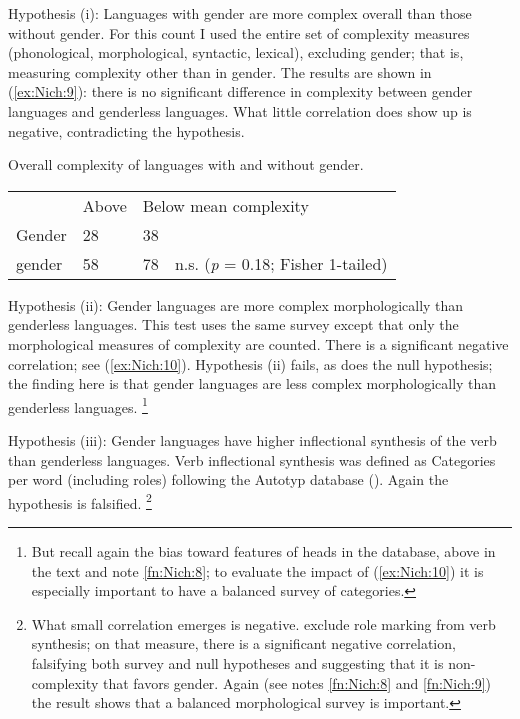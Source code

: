 \documentclass[output=collectionpaper]{langsci/langscibook}
\begin{document}
Hypothesis (i): Languages with gender are more complex overall than those without gender. For this count I used the entire set of complexity measures (phonological, morphological, syntactic, lexical), excluding gender; that is, measuring complexity other than in gender. The results are shown in (\ref{ex:Nich:9}): there is no significant difference in complexity between gender languages and genderless languages. What little correlation does show up is negative, contradicting the hypothesis.

\ea
\label{ex:Nich:9}
Overall complexity of languages with and without gender.   \\
\medskip
\begin{tabular}{p{2.7cm}p{1.3cm}p{1.3cm}l}
		 &	Above  &		\multicolumn{2}{l}{Below mean complexity} \\
	Gender &		28		 &38 \\
	\ili{No} gender	 & 58	 &	78	& n.s. (\textit{p} = 0.18; Fisher 1-tailed) \\
\end{tabular}
\z

Hypothesis (ii): Gender languages are more complex morphologically than genderless languages.  This test uses the same survey except that only the morphological measures of complexity are counted. There is a significant negative correlation; see (\ref{ex:Nich:10}). Hypothesis (ii) fails, as does the null hypothesis; the finding here is that gender languages are less complex morphologically than genderless languages.%
\footnote{%
But recall again the bias toward features of heads in the database, above in the text and note \ref{fn:Nich:8}; to evaluate the impact of (\ref{ex:Nich:10}) it is especially important to have a balanced survey of categories.
}%

%

Hypothesis (iii): Gender languages have higher inflectional synthesis of the verb than genderless languages. Verb inflectional synthesis was defined as Categories per word (including roles) following the Autotyp database (\citealt{Bickel2017}). Again the hypothesis is falsified.%
\footnote{%
What small correlation emerges is negative. \citet{Bickel2013} exclude role marking from verb synthesis; on that measure, there is a significant negative correlation, falsifying both survey and null hypotheses and suggesting that it is non-complexity that favors gender. Again (see notes \ref{fn:Nich:8} and \ref{fn:Nich:9}) the result shows that a balanced morphological survey is important.
}%
\end{document}
